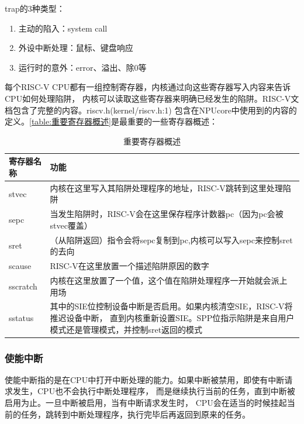 trap的3种类型：
\begin{enumerate}
    \item 主动的陷入：system call
    \item 外设中断处理：鼠标、键盘响应
    \item 运行时的意外：error、溢出、除0等
\end{enumerate}

每个RISC-V CPU都有一组控制寄存器，内核通过向这些寄存器写入内容来告诉CPU如何处理陷阱，
内核可以读取这些寄存器来明确已经发生的陷阱。RISC-V文档包含了完整的内容。riscv.h(kernel/riscv.h:1)
包含在NPUcore中使用到的内容的定义。\autoref{table:重要寄存器概述}是最重要的一些寄存器概述：

\begin{table}[h]
    \centering
    \caption{重要寄存器概述}
    \label{table:重要寄存器概述}
    \begin{tabularx}{0.8\textwidth}{|p{2cm}|X|}
    \hline
    \textbf{寄存器名称} & \textbf{功能}                                                     \\\hline
    stvec    & 内核在这里写入其陷阱处理程序的地址，RISC-V跳转到这里处理陷阱                     \\\hline
    sepc     & 当发生陷阱时，RISC-V会在这里保存程序计数器pc（因为pc会被stvec覆盖）              \\\hline
    sret     & （从陷阱返回）指令会将sepc复制到pc,内核可以写入sepc来控制sret的去向              \\\hline
    scause   & RISC-V在这里放置一个描述陷阱原因的数字                                         \\\hline
    sscratch & 内核在这里放置了一个值，这个值在陷阱处理程序一开始就会派上用场                    \\\hline
    sstatus  & 其中的SIE位控制设备中断是否启用。如果内核清空SIE，RISC-V将推迟设备中断，          
               直到内核重新设置SIE。SPP位指示陷阱是来自用户模式还是管理模式，并控制sret返回的模式 \\\hline
    \end{tabularx}
\end{table}

\subsubsection{使能中断}

使能中断指的是在CPU中打开中断处理的能力。如果中断被禁用，即使有中断请求发生，CPU也不会执行中断处理程序，
而是继续执行当前的任务，直到中断被启用为止。一旦中断被启用，当有中断请求发生时，
CPU会在适当的时候挂起当前的任务，跳转到中断处理程序，执行完毕后再返回到原来的任务。

